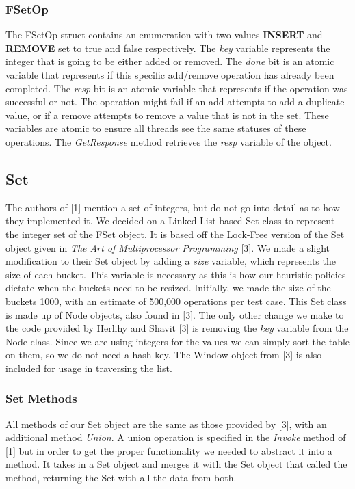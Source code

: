\documentclass[11pt]{article} %
\begin{document}
\subsubsection{FSetOp}

The FSetOp struct contains an enumeration with two values \textbf{INSERT} and \textbf{REMOVE} set to true and false respectively. The \textit{key} variable represents the integer that is going to be either added or removed. The \textit{done} bit is an atomic variable that represents if this specific add/remove operation has already been completed. The \textit{resp} bit is an atomic variable that represents if the operation was successful or not. The operation might fail if an add attempts to add a duplicate value, or if a remove attempts to remove a value that is not in the set. These variables are atomic to ensure all threads see the same statuses of these operations. The \textit{GetResponse} method retrieves the \textit{resp} variable of the object.

\subsection{Set}

The authors of [1] mention a set of integers, but do not go into detail as to how they implemented it. We decided on a Linked-List based Set class to represent the integer set of the FSet object. It is based off the Lock-Free version of the Set object given in \textit{The Art of Multiprocessor Programming} [3]. We made a slight modification to their Set object by adding a \textit{size} variable, which represents the size of each bucket. This variable is necessary as this is how our heuristic policies dictate when the buckets need to be resized. Initially, we made the size of the buckets 1000, with an estimate of 500,000 operations per test case. This Set class is made up of Node objects, also found in [3]. The only other change we make to the code provided by Herlihy and Shavit [3] is removing the \textit{key} variable from the Node class. Since we are using integers for the values we can simply sort the table on them, so we do not need a hash key. The Window object from [3] is also included for usage in traversing the list. 

\subsubsection{Set Methods}

All methods of our Set object are the same as those provided by [3], with an additional method \textit{Union}. A union operation is specified in the \textit{Invoke} method of [1] but in order to get the proper functionality we needed to abstract it into a method. It takes in a Set object and merges it with the Set object that called the method, returning the Set with all the data from both.
\end{document}
